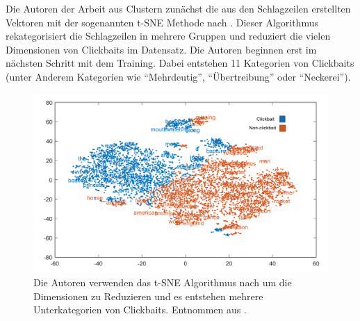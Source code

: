 Die Autoren der Arbeit aus \cite*{Pujahari} Clustern zunächst die aus den Schlagzeilen erstellten Vektoren mit der sogenannten t-SNE Methode nach \cite{VanDerMaaten2008}. Dieser Algorithmus rekategorisiert die Schlagzeilen in mehrere Gruppen und reduziert die vielen Dimensionen von Clickbaits im Datensatz. Die Autoren beginnen erst im nächsten Schritt mit dem Training. Dabei entstehen 11 Kategorien von Clickbaits (unter Anderem Kategorien wie \enquote{Mehrdeutig}, \enquote{Übertreibung} oder \enquote{Neckerei}).


\begin{figure}[H]
    \centering
    \includegraphics[width=12cm]{kapitel4/tsne.png}
    \caption[Clustering von Überschriften mit t-SNE]{Die Autoren verwenden das t-SNE Algorithmus nach \cite{VanDerMaaten2008} um die Dimensionen zu Reduzieren und es entstehen mehrere Unterkategorien von Clickbaits. Entnommen aus \cite*{Pujahari}.}
    \label{TSNE}
\end{figure}

